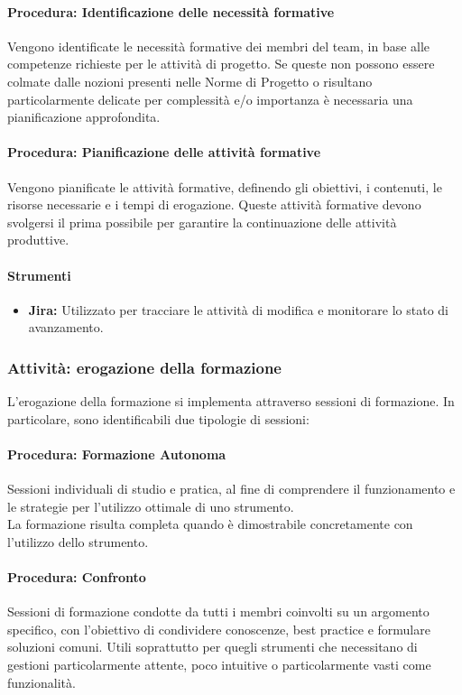 \documentclass[a4paper,12pt]{article}
\begin{document}
\paragraph{Procedura: Identificazione delle necessità formative}
Vengono identificate le necessità formative dei membri del team, in base alle
competenze richieste per le attività di progetto. Se queste non possono essere
colmate dalle nozioni presenti nelle Norme di Progetto o risultano
particolarmente delicate per complessità e/o importanza è necessaria una
pianificazione approfondita.
\paragraph{Procedura: Pianificazione delle attività formative}
Vengono pianificate le attività formative, definendo gli obiettivi, i
contenuti, le risorse necessarie e i tempi di erogazione. Queste attività
formative devono svolgersi il prima possibile per garantire la continuazione
delle attività produttive.
\paragraph{Strumenti}
\begin{itemize}
    \item \textbf{Jira:} Utilizzato per tracciare le attività di modifica e monitorare lo stato di avanzamento.
\end{itemize}

\subsubsection{Attività: erogazione della formazione}
L'erogazione della formazione si implementa attraverso sessioni di formazione.
In particolare, sono identificabili due tipologie di sessioni:

\paragraph{Procedura: Formazione Autonoma}
Sessioni individuali di studio e pratica, al fine di comprendere il
funzionamento e le strategie per l'utilizzo ottimale di uno strumento. \\La
formazione risulta completa quando è dimostrabile concretamente con l'utilizzo
dello strumento.
\paragraph{Procedura: Confronto}
Sessioni di formazione condotte da tutti i membri coinvolti su un argomento
specifico, con l'obiettivo di condividere conoscenze, best practice e formulare
soluzioni comuni. Utili soprattutto per quegli strumenti che necessitano di
gestioni particolarmente attente, poco intuitive o particolarmente vasti come
funzionalità.
\end{document}
